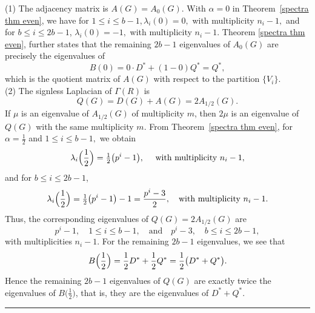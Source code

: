 \documentclass[12pt,twoside]{article}
\renewenvironment{proof}{{\noindent\bfseries Proof.}}{\qed}
\def\qed{\nolinebreak\hfill\rule{.2cm}{.2cm}\par\addvspace{.5cm}}
\begin{document}
\begin{proof}
	(1) The adjacency matrix is $A(G)=A_0(G)$. With $\alpha=0$ in Theorem~\ref{spectra thm even}, we have for
	$1\le i\le b-1, \lambda_i(0) = 0,$ with multiplicity $n_i-1,$	and for $b\le i\le 2b-1$, $\lambda_i(0) = -1,$ with multiplicity $n_i-1.$ Theorem \ref{spectra thm even}, further states that the remaining $2b-1$ eigenvalues of $A_0(G)$ are precisely the eigenvalues of
	\[
	B(0) = 0\cdot D^\ast + (1-0)Q^\ast = Q^\ast,
	\]
	which is the quotient matrix of $A(G)$ with respect to the partition $\{V_i\}$.\\
	(2) The signless Laplacian of $ \varGamma(R)$ is
	\[
	Q(G) = D(G)+A(G) = 2A_{1/2}(G).
	\]
	If $\mu$ is an eigenvalue of $A_{1/2}(G)$ of multiplicity $m$, then $2\mu$ is an eigenvalue of $Q(G)$ with the same multiplicity $m$. From Theorem~\ref{spectra thm even}, for $\alpha=\tfrac12$ and $1\le i\le b-1,$ we obtain
	\[
	\lambda_i\Bigl(\frac12\Bigr)
	= \tfrac12\bigl(p^{ i}-1\bigr),
	\quad\text{ with multiplicity }n_i-1,
	\]
	and for $b\le i\le 2b-1$,
	\[
	\lambda_i\Bigl(\frac12\Bigr)
	= \tfrac12\bigl(p^{ i}-1\bigr)-1
	= \frac{p^{ i}-3}{2},
	\quad\text{with multiplicity }n_i-1.
	\]
	Thus, the corresponding eigenvalues of $Q(G)=2A_{1/2}(G)$ are
	\[
	p^{ i}-1,\quad 1\le i\le b-1,
	\quad\text{and}\quad
	p^{ i}-3,\quad b\le i\le 2b-1,
	\]
	with multiplicities $n_i-1$.	For the remaining $2b-1$ eigenvalues, we see that
	\[
	B\Bigl(\frac12\Bigr) = \frac12D^\ast + \frac12Q^\ast = \frac12\bigl(D^\ast + Q^\ast\bigr).
	\]
	Hence the remaining $2b-1$ eigenvalues of $Q(G)$ are exactly twice the eigenvalues of
	$B\bigl(\tfrac12\bigr)$, that is, they are the eigenvalues of $D^\ast+Q^\ast$. 
\end{proof}
\end{document}

